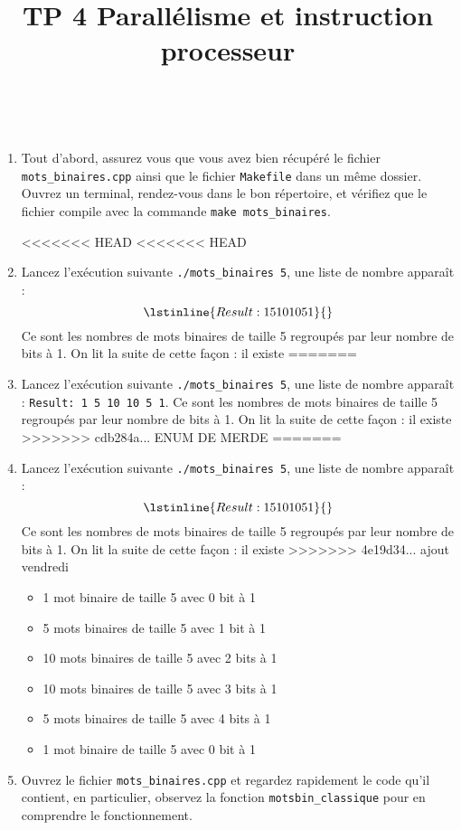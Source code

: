 \documentclass{cours}
\title{TP 4 Parallélisme et instruction processeur}
\newcommand{\lsti}[1]{\lstinline{#1}{}}
\begin{document}
\maketitle

\begin{exercice}\
\label{exo:binary}

\begin{enumerate}
\item Tout d'abord, assurez vous que vous avez bien récupéré le fichier \lsti{mots_binaires.cpp} ainsi que le fichier \lsti{Makefile} dans un même dossier. Ouvrez un terminal, rendez-vous dans le bon répertoire, et vérifiez que le fichier compile avec la commande \lsti{make mots_binaires}.

<<<<<<< HEAD
<<<<<<< HEAD
\item Lancez l'exécution suivante \lsti{./mots_binaires 5}, une liste de nombre apparaît : \[\lsti{Result: 1 5 10 10 5 1}\] Ce sont les nombres de mots binaires de taille 5 regroupés par leur nombre de bits à 1. On lit la suite de cette façon : il existe
=======
\item Lancez l'exécution suivante \lsti{./mots_binaires 5}, une liste de nombre apparaît : \lsti{Result: 1 5 10 10 5 1}. Ce sont les nombres de mots binaires de taille 5 regroupés par leur nombre de bits à 1. On lit la suite de cette façon : il existe
>>>>>>> cdb284a... ENUM DE MERDE
=======
\item Lancez l'exécution suivante \lsti{./mots_binaires 5}, une liste de nombre apparaît : \[\lsti{Result: 1 5 10 10 5 1}\] Ce sont les nombres de mots binaires de taille 5 regroupés par leur nombre de bits à 1. On lit la suite de cette façon : il existe
>>>>>>> 4e19d34... ajout vendredi
\begin{itemize}
\item 1 mot binaire de taille 5 avec 0 bit à 1
\item 5 mots binaires de taille 5 avec 1 bit à 1
\item 10 mots binaires de taille 5 avec 2 bits à 1
\item 10 mots binaires de taille 5 avec 3 bits à 1
\item 5 mots binaires de taille 5 avec 4 bits à 1
\item 1 mot binaire de taille 5 avec 0 bit à 1
\end{itemize}

\item Ouvrez le fichier \lsti{mots_binaires.cpp} et regardez rapidement le code qu'il contient, en particulier, observez la fonction \lsti{motsbin_classique} pour en comprendre le fonctionnement.


\end{enumerate}
\end{exercice}
\end{document}
